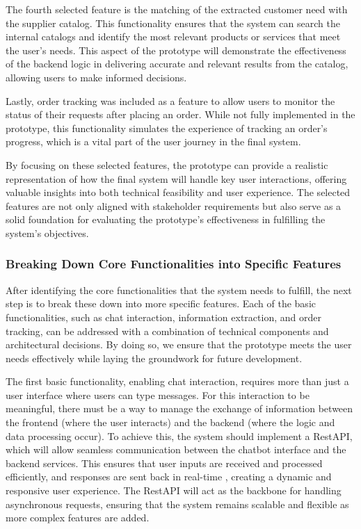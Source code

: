 The fourth selected feature is the matching of the extracted customer need with the supplier catalog. This functionality
ensures that the system can search the internal catalogs and identify the most relevant products or services that meet
the user's needs. This aspect of the prototype will demonstrate the effectiveness of the backend logic in delivering
accurate and relevant results from the catalog, allowing users to make informed decisions.

Lastly, order tracking was included as a feature to allow users to monitor the status of their requests after placing an
order. While not fully implemented in the prototype, this functionality simulates the experience of tracking an order's
progress, which is a vital part of the user journey in the final system.

By focusing on these selected features, the prototype can provide a realistic representation of how the final system
will handle key user interactions, offering valuable insights into both technical feasibility and user experience. The
selected features are not only aligned with stakeholder requirements but also serve as a solid foundation for evaluating
the prototype’s effectiveness in fulfilling the system's objectives.

\subsubsection{Breaking Down Core Functionalities into Specific Features}

After identifying the core functionalities that the system needs to fulfill, the next step is to break these down into
more specific features. Each of the basic functionalities, such as chat interaction, information extraction, and order
tracking, can be addressed with a combination of technical components and architectural decisions. By doing so, we
ensure that the prototype meets the user needs effectively while laying the groundwork for future development.

The first basic functionality, enabling chat interaction, requires more than just a user interface where users can type
messages. For this interaction to be meaningful, there must be a way to manage the exchange of information between the
frontend (where the user interacts) and the backend (where the logic and data processing occur). To achieve this, the
system should implement a RestAPI, which will allow seamless communication between the chatbot interface and the backend
services. This ensures that user inputs are received and processed efficiently, and responses are sent back in real-time
, creating a dynamic and responsive user experience. The RestAPI will act as the backbone for handling asynchronous
requests, ensuring that the system remains scalable and flexible as more complex features are added.

